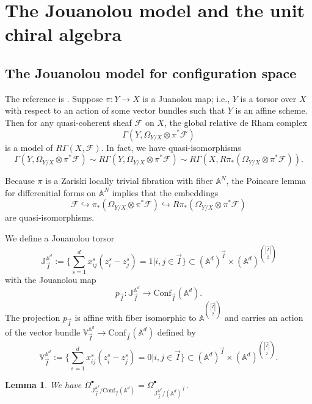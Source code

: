 \documentclass[11pt]{amsart}
\newtheorem{lem}[thm]{Lemma}
\theoremstyle{definition}
\theoremstyle{remark}
\numberwithin{equation}{section}
\begin{document}
\section{The Jouanolou model and the unit chiral algebra}

\subsection{The Jouanolou model for configuration space}
The reference is \cite[Section 4.1.3, pp279]{beilinson2004chiral}. Suppose $\pi:Y\rightarrow X$ is a Juanolou map; i.e., $Y$ is a torsor over $X$ with respect to an action of some vector bundles such that $Y$ is an affine scheme. Then for any quasi-coherent sheaf $\mathcal{F}$ on $X$, the global relative de Rham complex
$$
\Gamma(Y,\Omega_{Y/X}\otimes\pi^*\mathcal{F})
$$
is a model of $R\Gamma(X,\mathcal{F})$. In fact, we have quasi-isomorphisms
$$
\Gamma(Y,\Omega_{Y/X}\otimes\pi^*\mathcal{F})\sim R\Gamma(Y,\Omega_{Y/X}\otimes\pi^*\mathcal{F})\sim R\Gamma(X,R\pi_*(\Omega_{Y/X}\otimes\pi^*\mathcal{F})).
$$




Because $\pi$ is a Zariski locally trivial fibration with fiber $\mathbb{A}^N$, the Poincare lemma for differenitial forms on $\mathbb{A}^N$ implies that the embeddings
$$
\mathcal{F}\hookrightarrow \pi_*(\Omega_{Y/X}\otimes\pi^*\mathcal{F})\hookrightarrow R\pi_*(\Omega_{Y/X}\otimes\pi^*\mathcal{F})
$$
are quasi-isomorphisms.

We define a Jouanolou torsor
$$
\mathbb{J}^{\mathbb{A}^d}_{\vec{I}}:=\{\sum_{s=1}^d x_{ij}^s(z^s_i-z^s_j)=1|i,j\in \vec{I}\}\subset (\mathbb{A}^d)^{\vec{I}}\times (\mathbb{A}^d)^{\binom{|\vec{I}|}{2}}
$$
with the Jouanolou map
$$
p_{\vec{I}}:\mathbb{J}^{\mathbb{A}^d}_{\vec{I}}\rightarrow \mathrm{Conf}_{\vec{I}}(\mathbb{A}^d).
$$
The projection $p_{\vec{I}}$ is affine with fiber isomorphic to $\mathbb{A}^{\binom{|\vec{I}|}{2}}$ and carries an action of the vector bundle $\mathbb{V}^{\mathbb{A}^d}_{\vec{I}}\rightarrow \mathrm{Conf}_{\vec{I}}(\mathbb{A}^d)$ defined by
$$
\mathbb{V}^{\mathbb{A}^d}_{\vec{I}}:=\{\sum_{s=1}^d x_{ij}^s(z^s_i-z^s_j)=0|i,j\in \vec{I}\}\subset (\mathbb{A}^d)^{\vec{I}}\times (\mathbb{A}^d)^{\binom{|\vec{I}|}{2}}.
$$
\begin{lem}
    We have $\Omega^{\bullet}_{\mathbb{J}^{\mathbb{A}^d}_{\vec{I}}/\mathrm{Conf}_{\vec{I}}(\mathbb{A}^d)}=\Omega^{\bullet}_{\mathbb{J}^{\mathbb{A}^d}_{\vec{I}}/(\mathbb{A}^d)^{\vec{I}}}$.
\end{lem}
\end{document}
